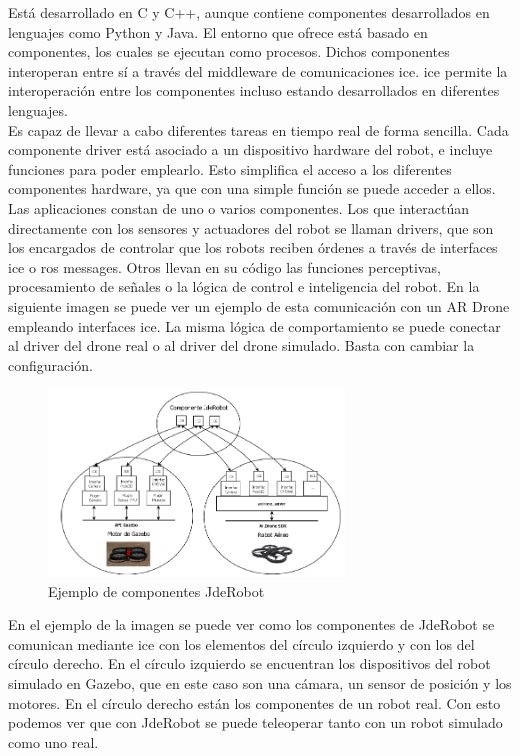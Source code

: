 Está desarrollado en C y C++, aunque contiene componentes desarrollados en lenguajes como Python y Java. El entorno que ofrece está basado en componentes, los cuales se ejecutan como procesos. Dichos componentes interoperan entre sí a través del middleware de comunicaciones \acrshort{ice}. \acrshort{ice} permite la interoperación entre los componentes incluso estando desarrollados en diferentes lenguajes.\\

Es capaz de llevar a cabo diferentes tareas en tiempo real de forma sencilla. Cada componente driver está asociado a un dispositivo hardware del robot, e incluye funciones para poder emplearlo. Esto simplifica el acceso a los diferentes componentes hardware, ya que con una simple función se puede acceder a ellos.\\

Las aplicaciones constan de uno o varios componentes. Los que interactúan directamente con los sensores y actuadores del robot se llaman drivers, que son los encargados de controlar que los robots reciben órdenes a través de interfaces \acrshort{ice} o \acrshort{ros} messages. Otros llevan en su código las funciones perceptivas, procesamiento de señales o la lógica de control e inteligencia del robot. En la siguiente imagen se puede ver un ejemplo de esta comunicación con un AR Drone empleando interfaces \acrshort{ice}. La misma lógica de comportamiento se puede conectar al driver del drone real o al driver del drone simulado. Basta con cambiar la configuración.

\begin{figure}[H]
  \begin{center}
    \includegraphics[width=0.7\textwidth]{figures/Infraestructura/jderobot.png}
		\caption{Ejemplo de componentes JdeRobot }
		\label{fig.jderobot}
		\end{center}
\end{figure}
En el ejemplo de la imagen se puede ver como los componentes de JdeRobot se comunican mediante \acrshort{ice} con los elementos del círculo izquierdo y con los del círculo derecho. En el círculo izquierdo se encuentran los dispositivos del robot simulado en Gazebo, que en este caso son una cámara, un sensor de posición y los motores. En el círculo derecho están los componentes de un robot real. Con esto podemos ver que con JdeRobot se puede teleoperar tanto con un robot simulado como uno real.\\

